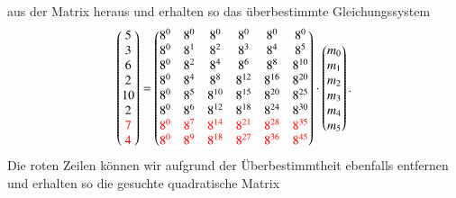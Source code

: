 aus der Matrix heraus und erhalten so das überbestimmte Gleichungssystem
\[
\begin{pmatrix}
	5 \\ 3 \\ 6 \\ 2 \\ 10 \\ 2 \\ \textcolor{red}{7} \\ \textcolor{red}{4} \\
\end{pmatrix}
=
\begin{pmatrix}
	8^0&    8^0&    8^0&    8^0&    8^0&    8^0\\
	8^0&	8^1&	8^2&	8^3&	8^4&	8^5\\
	8^0&	8^2&	8^4&	8^6&	8^8& 8^{10}\\
	8^0&	8^4&	8^8& 8^{12}& 8^{16}& 8^{20}\\
	8^0&	8^5& 8^{10}& 8^{15}& 8^{20}& 8^{25}\\
	8^0&	8^6& 8^{12}& 8^{18}& 8^{24}& 8^{30}\\
	\textcolor{red}{8^0}&	\textcolor{red}{8^7}& \textcolor{red}{8^{14}}& \textcolor{red}{8^{21}}& \textcolor{red}{8^{28}}& \textcolor{red}{8^{35}}\\
	\textcolor{red}{8^0}&	\textcolor{red}{8^9}& \textcolor{red}{8^{18}}& \textcolor{red}{8^{27}}& \textcolor{red}{8^{36}}& \textcolor{red}{8^{45}}\\
\end{pmatrix}
\cdot
\begin{pmatrix}
	m_0 \\ m_1 \\ m_2 \\ m_3 \\ m_4 \\ m_5 \\
\end{pmatrix}
.
\]
Die roten Zeilen können wir aufgrund der Überbestimmtheit ebenfalls entfernen und erhalten so die gesuchte quadratische Matrix
